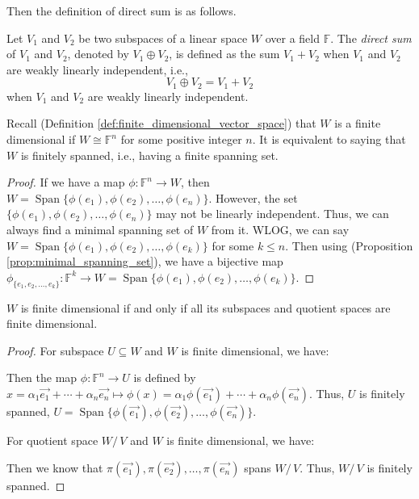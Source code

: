 \documentclass[
	11pt, %
	fleqn, %
	a4paper, %
]{LegrandOrangeBook}
\newcommand{\quotient}[2]{#1 /\, #2} %
\newcommand{\F}{\mathbb{F}} %
\DeclareMathOperator{\Span}{Span}
\begin{document}
Then the definition of direct sum is as follows.
\begin{definition}
    Let $V_1$ and $V_2$ be two subspaces of a linear space $W$ over a field $\F$. The \emph{direct sum} of $V_1$ and $V_2$, denoted by $V_1 \oplus V_2$, is defined as the sum $V_1 + V_2$ when $V_1$ and $V_2$ are weakly linearly independent, i.e.,
    \[
        V_1 \oplus V_2 = V_1 + V_2
    \]
    when $V_1$ and $V_2$ are weakly linearly independent.    
\end{definition}

Recall (Definition \ref{def:finite_dimensional_vector_space}) that $W$ is a finite dimensional if $W \cong \F^n$ for some positive integer $n$. It is equivalent to saying that $W$ is finitely spanned, i.e., having a finite spanning set.

\begin{proof}
    If we have a map $\phi : \F^n \to W$, then $W = \Span\{\phi(e_1), \phi(e_2), \ldots, \phi(e_n)\}$. However, the set $\{\phi(e_1), \phi(e_2), \ldots, \phi(e_n)\}$ may not be linearly independent. Thus, we can always find a minimal spanning set of $W$ from it. WLOG, we can say $W = \Span\{\phi(e_1), \phi(e_2), \ldots, \phi(e_k)\}$ for some $k \leq n$. Then using (Proposition \ref{prop:minimal_spanning_set}), we have a bijective map $\phi_{\{e_1, e_2, \ldots, e_k\}} : \F^k \to W = \Span\{\phi(e_1), \phi(e_2), \ldots, \phi(e_k)\}$.
\end{proof}

\begin{proposition} \label{prop:finite_dimensional_subspace_quotient_space}
    $W$ is finite dimensional if and only if all its subspaces and quotient spaces are finite dimensional.
\end{proposition}

\begin{proof}
    For subspace $U \subseteq W$ and $W$ is finite dimensional, we have:
    \begin{center}
    \end{center}
    Then the map $\phi : \F^n \to U$ is defined by $x = \alpha_1 \vec{e_1} + \cdots + \alpha_n \vec{e_n} \mapsto \phi(x) = \alpha_1 \phi(\vec{e_1}) + \cdots + \alpha_n \phi(\vec{e_n})$. Thus, $U$ is finitely spanned, $U = \Span\{\phi(\vec{e_1}), \phi(\vec{e_2}), \ldots, \phi(\vec{e_n})\}$. 

    For quotient space $\quotient{W}{V}$ and $W$ is finite dimensional, we have:
    \begin{center}
    \end{center}
    Then we know that $\pi(\vec{e_1}), \pi(\vec{e_2}), \ldots, \pi(\vec{e_n})$ spans $\quotient{W}{V}$. Thus, $\quotient{W}{V}$ is finitely spanned.
\end{proof}
\end{document}
